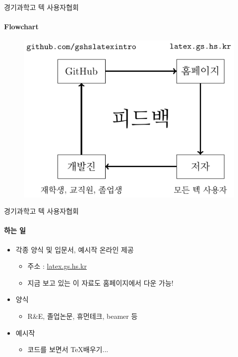 \documentclass[12pt]{beamer}
\begin{document}
\begin{frame}{경기과학고 텍 사용자협회}
	\framesubtitle{Flowchart}
	\begin{figure}[h]
		\centering
		\includegraphics[width=\textwidth]{gshstexsociety_structure.pdf}
	\end{figure}
\end{frame}
\begin{frame}{경기과학고 텍 사용자협회}
	\framesubtitle{하는 일}
	\begin{itemize}
		\item 각종 양식 및 입문서, 예시작 온라인 제공
		\begin{itemize}
			\item 주소 : \url{latex.gs.hs.kr}
			\item 지금 보고 있는 이 자료도 홈페이지에서 다운 가능!
		\end{itemize}
		\item 양식
		\begin{itemize}
			\item R\&E, 졸업논문, 휴먼테크, beamer 등
		\end{itemize}
		\item 예시작
		\begin{itemize}
			\item 코드를 보면서 \TeX 배우기...
		\end{itemize}
	\end{itemize}
\end{frame}
\end{document}
